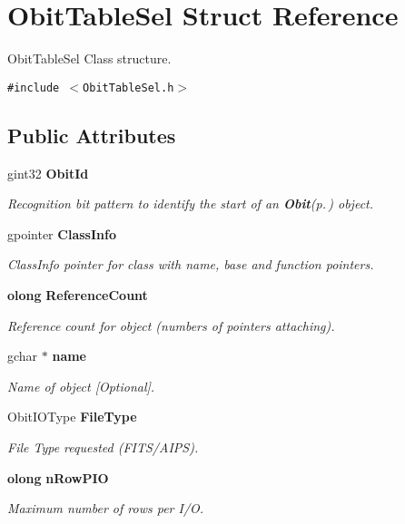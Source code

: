 \section{Obit\-Table\-Sel Struct Reference}
\label{structObitTableSel}
Obit\-Table\-Sel Class structure.  


{\tt \#include $<$Obit\-Table\-Sel.h$>$}

\subsection*{Public Attributes}
\begin{CompactItemize}
\item 
gint32 {\bf Obit\-Id}
\begin{CompactList}\small\item\em Recognition bit pattern to identify the start of an {\bf Obit}{\rm (p.\,\pageref{structObit})} object. \item\end{CompactList}\item 
gpointer {\bf Class\-Info}
\begin{CompactList}\small\item\em Class\-Info pointer for class with name, base and function pointers. \item\end{CompactList}\item 
{\bf olong} {\bf Reference\-Count}
\begin{CompactList}\small\item\em Reference count for object (numbers of pointers attaching). \item\end{CompactList}\item 
gchar $\ast$ {\bf name}
\begin{CompactList}\small\item\em Name of object [Optional]. \item\end{CompactList}\item 
Obit\-IOType {\bf File\-Type}
\begin{CompactList}\small\item\em File Type requested (FITS/AIPS). \item\end{CompactList}\item 
{\bf olong} {\bf n\-Row\-PIO}
\begin{CompactList}\small\item\em Maximum number of rows per I/O. \item\end{CompactList}\end{CompactItemize}


